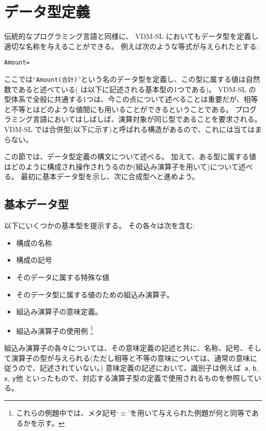 \documentclass[\pformat,12pt]{jarticle}
\newcommand{\vdmslpp}[2]{%
#1
}
\newcommand{\vdmsl}{VDM-SL}
\newcommand{\vdmpp}{VDM++}
\begin{document}
\section{データ型定義}
\label{typedef}

伝統的なプログラミング言語と同様に、\vdmslpp{\vdmsl}{\vdmpp}においてもデータ型を定義し適切な名称を与えることができる。
例えば次のような等式が与えられたとする:

\begin{alltt}
  Amount = 
\end{alltt}
ここでは``{\tt Amount(合計)}''という名のデータ型を定義し、この型に属する値は自然数であると述べている( は以下に記述される基本型の1つである)。
\vdmslpp{\vdmsl}{\vdmpp}の型体系で全般に共通する1つは、今この点について述べることは重要だが、相等と不等とはどのような値間にも用いることができるということである。 
プログラミング言語においてはしばしば、演算対象が同じ型であることを要求される。
\vdmslpp{\vdmsl}{\vdmpp}では合併型(以下に示す)と呼ばれる構造があるので、これには当てはまらない。

この節では、データ型定義の構文について述べる。
加えて、ある型に属する値はどのように構成され操作されうるのか(組込み演算子を用いて)について述べる。
最初に基本データ型を示し、次に合成型へと進めよう。

\subsection{基本データ型}

以下にいくつかの基本型を提示する。
その各々は次を含む:

\begin{itemize}
\item 構成の名称
\item 構成の記号
\item そのデータに属する特殊な値
\item そのデータ型に属する値のための組込み演算子。
\item 組込み演算子の意味定義。
\item 組込み演算子の使用例
  \footnote{これらの例題中では、メタ記号`$\equiv$'を用いて与えられた例題が何と同等であるかを示す。}
\end{itemize}
組込み演算子の各々については、その意味定義の記述と共に、名称、記号、そして演算子の型が与えられる(ただし相等と不等の意味については、通常の意味に従うので、記述されていない。)
意味定義の記述において、識別子は例えば\ {\tt a}, {\tt b}, {\tt x}, {\tt y}他 といったもので、対応する演算子型の定義で使用されるものを参照している。
\end{document}
